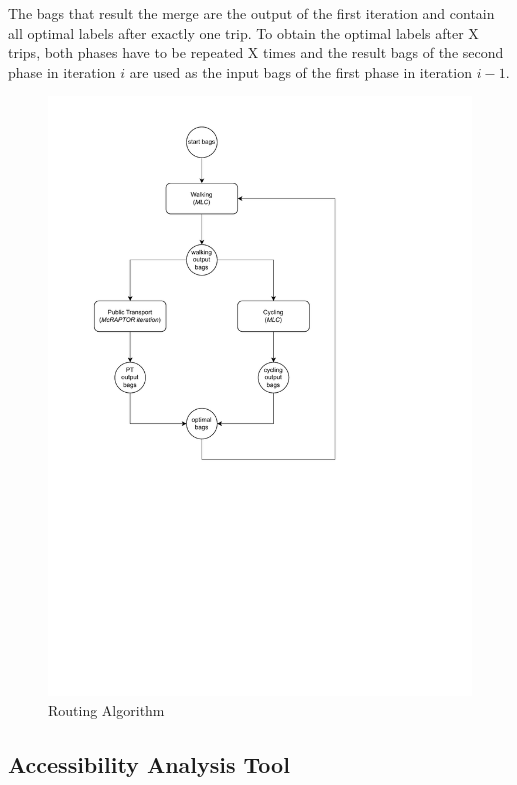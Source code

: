 The bags that result the merge are the output of the first iteration and contain all optimal labels after exactly one trip.
To obtain the optimal labels after X trips, both phases have to be repeated X times and the result bags of the second phase in iteration \(i\) are used as the input bags of the first phase in iteration \(i-1\).


\begin{figure}
    \centering
    \includegraphics[scale=0.75]{Figures/method/routing_algorithm}
    \caption{Routing Algorithm}
    \label{fig:routing_algorithm}
\end{figure}


\subsection{Accessibility Analysis Tool}
\label{subsec:combining}

